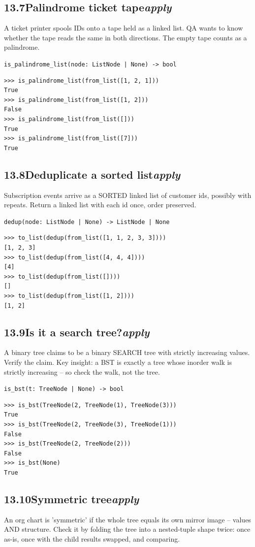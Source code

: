 \documentclass[10pt,letterpaper]{book}
\begin{document}
\subsection*{13.7\quad Palindrome ticket tape\hfill\textnormal{\textit{apply}}}
A ticket printer spools IDs onto a tape held as a linked list. QA wants to know whether the tape reads the same in both directions. The empty tape counts as a palindrome.

\noindent\texttt{is\_palindrome\_list(node: ListNode | None) -> bool}
\begin{lstlisting}[style=ex]
>>> is_palindrome_list(from_list([1, 2, 1]))
True
>>> is_palindrome_list(from_list([1, 2]))
False
>>> is_palindrome_list(from_list([]))
True
>>> is_palindrome_list(from_list([7]))
True
\end{lstlisting}
\subsection*{13.8\quad Deduplicate a sorted list\hfill\textnormal{\textit{apply}}}
Subscription events arrive as a SORTED linked list of customer ids, possibly with repeats. Return a linked list with each id once, order preserved.

\noindent\texttt{dedup(node: ListNode | None) -> ListNode | None}
\begin{lstlisting}[style=ex]
>>> to_list(dedup(from_list([1, 1, 2, 3, 3])))
[1, 2, 3]
>>> to_list(dedup(from_list([4, 4, 4])))
[4]
>>> to_list(dedup(from_list([])))
[]
>>> to_list(dedup(from_list([1, 2])))
[1, 2]
\end{lstlisting}
\subsection*{13.9\quad Is it a search tree?\hfill\textnormal{\textit{apply}}}
A binary tree claims to be a binary SEARCH tree with strictly increasing values. Verify the claim. Key insight: a BST is exactly a tree whose inorder walk is strictly increasing -- so check the walk, not the tree.

\noindent\texttt{is\_bst(t: TreeNode | None) -> bool}
\begin{lstlisting}[style=ex]
>>> is_bst(TreeNode(2, TreeNode(1), TreeNode(3)))
True
>>> is_bst(TreeNode(2, TreeNode(3), TreeNode(1)))
False
>>> is_bst(TreeNode(2, TreeNode(2)))
False
>>> is_bst(None)
True
\end{lstlisting}
\subsection*{13.10\quad Symmetric tree\hfill\textnormal{\textit{apply}}}
An org chart is 'symmetric' if the whole tree equals its own mirror image -- values AND structure. Check it by folding the tree into a nested-tuple shape twice: once as-is, once with the child results swapped, and comparing.
\end{document}

